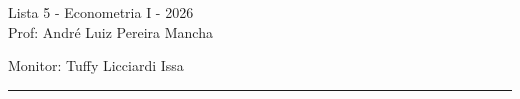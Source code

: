 \documentclass[12pt,letterpaper, onecolumn]{exam}
\begin{document}
\begingroup  
    \centering
    \LARGE Lista 5 - Econometria I - 2026\\[0.5em]
    \large Prof: André Luiz Pereira Mancha \par
    \large Monitor: Tuffy Licciardi Issa  \par
\endgroup
\rule{\textwidth}{0.4pt}
\pointsdroppedatright   %
\printanswers
\renewcommand{\solutiontitle}{\noindent\textbf{Ans:}\enspace}   %
\newcommand{\qstar}{\hspace{-0.6em}\textsuperscript{*}\hspace{0.2em}}
\end{document}
